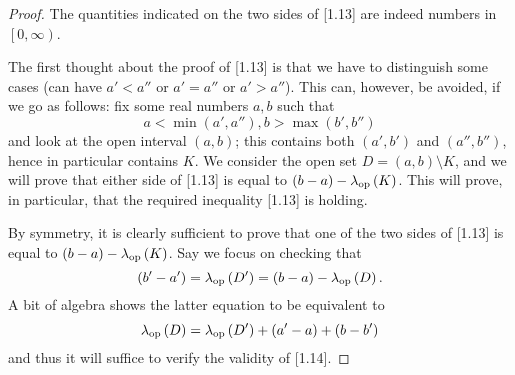 \documentclass[pmath450]{subfiles}
\begin{document}
    \begin{proof}
        The quantities indicated on the two sides of [1.13] are indeed numbers in $\left[ 0,\infty \right)$. 

        The first thought about the proof of [1.13] is that we have to distinguish some cases (can have $a'<a''$ or $a'=a''$ or $a'>a''$). This can, however, be avoided, if we go as follows: fix some real numbers $a,b$ such that
        \begin{equation*}
            a<\min\left( a',a'' \right), b>\max\left( b',b'' \right)
        \end{equation*}
        and look at the open interval $\left( a,b \right)$; this contains both $\left( a',b' \right)$ and $\left( a'',b'' \right)$, hence in particular contains $K$. We consider the open set $D=\left( a,b \right)\setminus K$, and we will prove that either side of [1.13] is equal to $\left( b-a \right)-\lambda_{\operatorname{op}}\left( K \right)$. This will prove, in particular, that the required inequality [1.13] is holding.

        By symmetry, it is clearly sufficient to prove that one of the two sides of [1.13] is equal to $\left( b-a \right)-\lambda_{\operatorname{op}}\left( K \right)$. Say we focus on checking that
        \begin{equation*}
            \left( b'-a' \right)=\lambda_{\operatorname{op}}\left( D' \right)=\left( b-a \right)-\lambda_{\operatorname{op}}\left( D \right).
        \end{equation*}
        A bit of algebra shows the latter equation to be equivalent to
        \begin{equation}
            \lambda_{\operatorname{op}}\left( D \right)=\lambda_{\operatorname{op}}\left( D' \right)+\left( a'-a \right)+\left( b-b' \right)
        \end{equation}
        and thus it will suffice to verify the validity of [1.14].


\end{proof}
\end{document}
